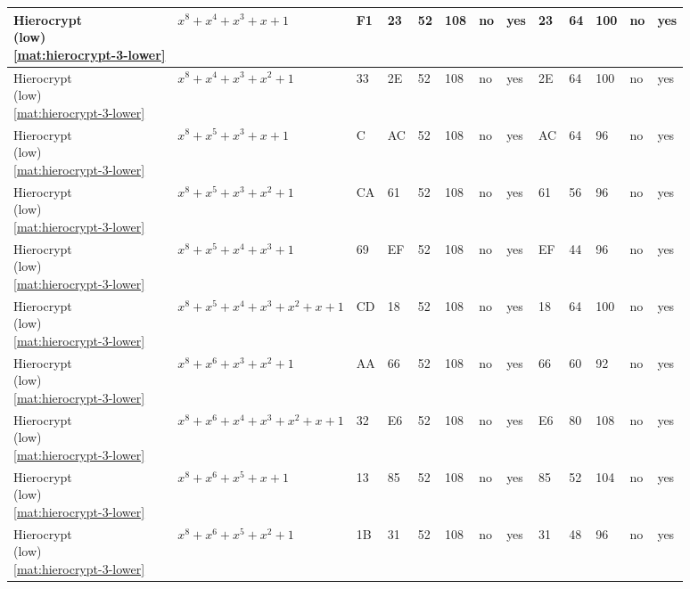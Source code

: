 \begin{tiny}
\begin{longtable}{|l|l|l|l|l|l|l|l|l|l|l|l|l|}
\shortstack{Hierocrypt \\ (low) \\ \eqref{mat:hierocrypt-3-lower}} & $x^8 + x^4 + x^3 + x + 1$ & F1 & 23 & 52 & 108 & no & yes & 23 & 64 & 100 & no & yes \\ \hline
\shortstack{Hierocrypt \\ (low) \\ \eqref{mat:hierocrypt-3-lower}} & $x^8 + x^4 + x^3 + x^2 + 1$ & 33 & 2E & 52 & 108 & no & yes & 2E & 64 & 100 & no & yes \\ \hline
\shortstack{Hierocrypt \\ (low) \\ \eqref{mat:hierocrypt-3-lower}} & $x^8 + x^5 + x^3 + x + 1$ & C & AC & 52 & 108 & no & yes & AC & 64 & 96 & no & yes \\ \hline
\shortstack{Hierocrypt \\ (low) \\ \eqref{mat:hierocrypt-3-lower}} & $x^8 + x^5 + x^3 + x^2 + 1$ & CA & 61 & 52 & 108 & no & yes & 61 & 56 & 96 & no & yes \\ \hline
\shortstack{Hierocrypt \\ (low) \\ \eqref{mat:hierocrypt-3-lower}} & $x^8 + x^5 + x^4 + x^3 + 1$ & 69 & EF & 52 & 108 & no & yes & EF & 44 & 96 & no & yes \\ \hline
\shortstack{Hierocrypt \\ (low) \\ \eqref{mat:hierocrypt-3-lower}} & $x^8 + x^5 + x^4 + x^3 + x^2 + x + 1$ & CD & 18 & 52 & 108 & no & yes & 18 & 64 & 100 & no & yes \\ \hline
\shortstack{Hierocrypt \\ (low) \\ \eqref{mat:hierocrypt-3-lower}} & $x^8 + x^6 + x^3 + x^2 + 1$ & AA & 66 & 52 & 108 & no & yes & 66 & 60 & 92 & no & yes \\ \hline
\shortstack{Hierocrypt \\ (low) \\ \eqref{mat:hierocrypt-3-lower}} & $x^8 + x^6 + x^4 + x^3 + x^2 + x + 1$ & 32 & E6 & 52 & 108 & no & yes & E6 & 80 & 108 & no & yes \\ \hline
\shortstack{Hierocrypt \\ (low) \\ \eqref{mat:hierocrypt-3-lower}} & $x^8 + x^6 + x^5 + x + 1$ & 13 & 85 & 52 & 108 & no & yes & 85 & 52 & 104 & no & yes \\ \hline
\shortstack{Hierocrypt \\ (low) \\ \eqref{mat:hierocrypt-3-lower}} & $x^8 + x^6 + x^5 + x^2 + 1$ & 1B & 31 & 52 & 108 & no & yes & 31 & 48 & 96 & no & yes \\ \hline

\end{longtable}
\end{tiny}
